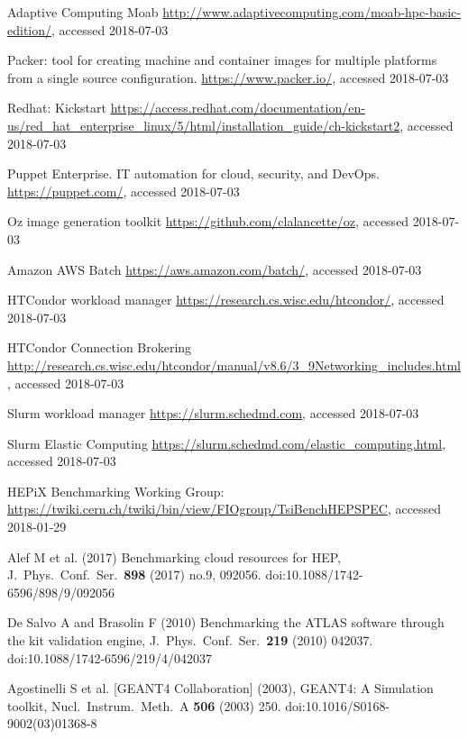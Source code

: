 \begin{thebibliography}{}
Adaptive Computing Moab
\url{http://www.adaptivecomputing.com/moab-hpc-basic-edition/}, accessed 2018-07-03

Packer: tool for creating machine and container images for multiple platforms from a single source configuration. 
\url{https://www.packer.io/}, accessed 2018-07-03

 Redhat: Kickstart
\url{https://access.redhat.com/documentation/en-us/red_hat_enterprise_linux/5/html/installation_guide/ch-kickstart2}, accessed 2018-07-03

Puppet Enterprise. IT automation for cloud, security, and DevOps.
\url{https://puppet.com/}, accessed 2018-07-03


Oz image generation toolkit
\url{https://github.com/clalancette/oz}, accessed 2018-07-03

Amazon AWS Batch
\url{https://aws.amazon.com/batch/}, accessed 2018-07-03

HTCondor workload manager
\url{https://research.cs.wisc.edu/htcondor/}, accessed 2018-07-03

HTCondor Connection Brokering
\url{http://research.cs.wisc.edu/htcondor/manual/v8.6/3_9Networking_includes.html}, accessed 2018-07-03

  Slurm workload manager
  \url{https://slurm.schedmd.com}, accessed 2018-07-03
    
Slurm Elastic Computing
\url{https://slurm.schedmd.com/elastic_computing.html}, accessed 2018-07-03


 HEPiX Benchmarking Working Group:
\url{https://twiki.cern.ch/twiki/bin/view/FIOgroup/TsiBenchHEPSPEC}, accessed 2018-01-29


Alef M  et al. (2017) Benchmarking cloud resources for HEP,
J.\ Phys.\ Conf.\ Ser.\  {\bf 898} (2017) no.9,  092056.
doi:10.1088/1742-6596/898/9/092056

De Salvo A and Brasolin F (2010)
Benchmarking the ATLAS software through the kit validation engine,
J.\ Phys.\ Conf.\ Ser.\  {\bf 219} (2010) 042037.
doi:10.1088/1742-6596/219/4/042037

Agostinelli S  et al. [GEANT4 Collaboration] (2003),        
GEANT4: A Simulation toolkit,                          
Nucl.\ Instrum.\ Meth.\ A {\bf 506} (2003) 250.            
doi:10.1016/S0168-9002(03)01368-8                          


\end{thebibliography}
